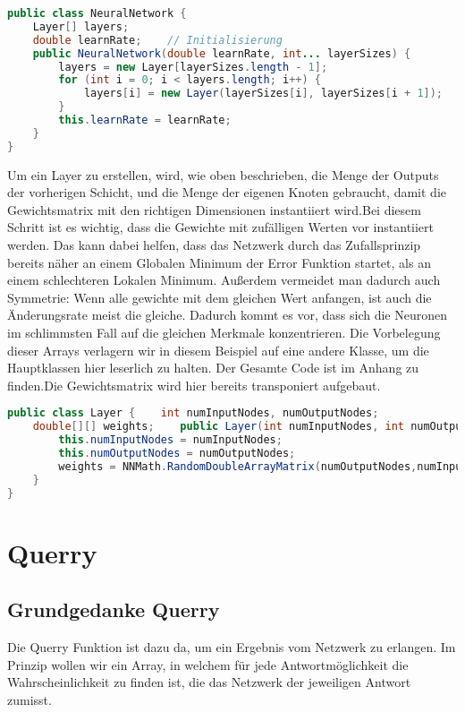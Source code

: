 \documentclass[12pt]{article}
\begin{document}
\begin{lstlisting}[language=Java]
public class NeuralNetwork {
    Layer[] layers;
    double learnRate;    // Initialisierung
    public NeuralNetwork(double learnRate, int... layerSizes) {
        layers = new Layer[layerSizes.length - 1];
        for (int i = 0; i < layers.length; i++) {
            layers[i] = new Layer(layerSizes[i], layerSizes[i + 1]);
        }
        this.learnRate = learnRate;
    }
}
\end{lstlisting}Um ein Layer zu erstellen, wird, wie oben beschrieben, die Menge der Outputs der vorherigen Schicht, und die Menge der eigenen Knoten gebraucht, damit die Gewichtsmatrix mit den richtigen Dimensionen instantiiert wird.Bei diesem Schritt ist es wichtig, dass die Gewichte mit zufälligen Werten vor instantiiert werden. Das kann dabei helfen, dass das Netzwerk durch das Zufallsprinzip bereits näher an einem Globalen Minimum der Error Funktion startet, als an einem schlechteren Lokalen Minimum. Außerdem vermeidet man dadurch auch Symmetrie: Wenn alle gewichte mit dem gleichen Wert anfangen, ist auch die Änderungsrate meist die gleiche. Dadurch kommt es vor, dass sich die Neuronen im schlimmsten Fall auf die gleichen Merkmale konzentrieren. Die Vorbelegung dieser Arrays verlagern wir in diesem Beispiel auf eine andere Klasse, um die Hauptklassen hier leserlich zu halten. Der Gesamte Code ist im Anhang zu finden.Die Gewichtsmatrix wird hier bereits transponiert aufgebaut.\begin{lstlisting}[language=Java]
public class Layer {    int numInputNodes, numOutputNodes;
    double[][] weights;    public Layer(int numInputNodes, int numOutputNodes) {
        this.numInputNodes = numInputNodes;
        this.numOutputNodes = numOutputNodes;
        weights = NNMath.RandomDoubleArrayMatrix(numOutputNodes,numInputNodes);
    }
}
\end{lstlisting}\section{ Querry}\subsection{ Grundgedanke Querry}Die Querry Funktion ist dazu da, um ein Ergebnis vom Netzwerk zu erlangen. Im Prinzip wollen wir ein Array, in welchem für jede Antwortmöglichkeit die Wahrscheinlichkeit zu finden ist, die das Netzwerk der jeweiligen Antwort zumisst. 
\end{document}
